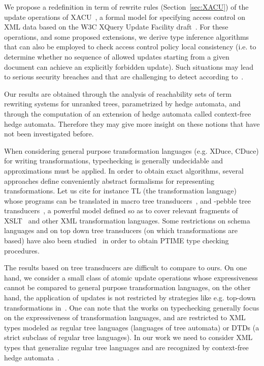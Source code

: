 \documentclass[a4paper]{article}
\newcommand{\remarque}[1]{}
\theoremstyle{plain}
\newcommand{\XACU}{\textsf{XACU}}
\begin{document}
We propose a redefinition in term of rewrite rules (Section~\ref{sec:XACU})  
of the update operations of \XACU~\cite{FundulakiManeth07}, 
a formal model for specifying access control on XML data 
based on the W3C XQuery Update Facility draft~\cite{xqupdate}.
For these operations, and some proposed extensions,
we derive type inference algorithms that can also be 
employed to check access control policy local consistency
(i.e. to determine whether no sequence of allowed updates 
 starting from a given document can achieve 
 an explicitly forbidden update). 
Such situations may lead to serious security breaches 
and that are  challenging to detect according to~\cite{FundulakiManeth07}.
\remarque{+ provide control of application context}
Our results are obtained through the analysis of reachability sets of 
term rewriting systems for unranked trees, 
parametrized by hedge automata, and through the computation  
of an extension of hedge automata called context-free hedge automata. 
Therefore they may give more insight on these notions that have not been investigated before. 


\medskip{}
When considering general purpose transformation languages (e.g. XDuce, CDuce)
for writing transformations, typechecking is generally undecidable
and approximations must be applied.
In order to obtain exact algorithms, several approaches define conveniently
abstract formalisms for representing transformations.
Let us cite for instance TL (the transformation language)~\cite{ManethBPS05}
whose programs can be translated in macro tree transducers~\cite{MTT04},
and -pebble tree transducers~\cite{MiloSuciuVianu03},
a powerful model defined so as to cover relevant fragments
of XSLT~\cite{XSLT} and other XML transformation languages.
Some restrictions on schema languages and on
top down tree transducers (on which transformations are based)
have also been studied~\cite{MartensNeven04}
in order to obtain PTIME type checking procedures.

The  results based on tree transducers are difficult to compare to ours. 
On one hand, we consider a small class of atomic update operations
whose expressiveness cannot be compared to general purpose transformation languages,
on the other hand, the application of updates is not restricted by strategies 
like e.g. top-down  transformations in~\cite{MartensNeven04}.
One can note that the works on typechecking
generally focus on the expressiveness of transformation languages,
and are restricted to XML types modeled as regular tree languages 
(languages of tree automata) or DTDs (a strict subclass of regular tree languages).
In our work we need to consider  XML types that generalize  regular tree languages 
and are recognized by context-free hedge automata~\cite{JR-rta2008}. 
\end{document}
